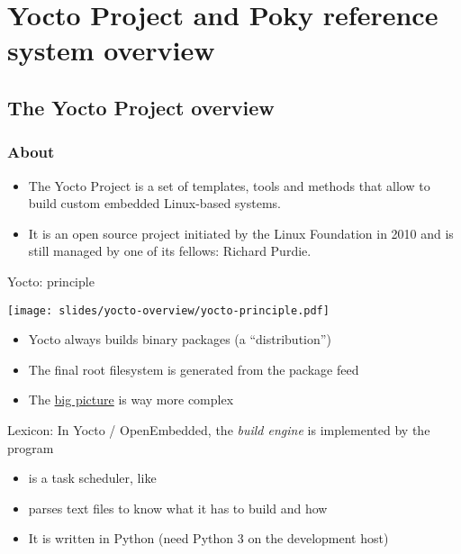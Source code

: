 \section{Yocto Project and Poky reference system overview}

\subsection{The Yocto Project overview}

\begin{frame}
  \frametitle{About}
  \begin{itemize}
  \item The Yocto Project is a set of templates, tools and methods
        that allow to build custom embedded Linux-based systems.
  \item It is an open source project initiated by the Linux Foundation
        in 2010 and is still managed by one of its fellows: Richard
        Purdie.
  \end{itemize}
\end{frame}

\begin{frame}{Yocto: principle}
  \begin{center}
    \texttt{[image: slides/yocto-overview/yocto-principle.pdf]}
  \end{center}
  \begin{itemize}
  \item Yocto always builds binary packages (a ``distribution'')
  \item The final root filesystem is generated from the package feed
  \item The \href{https://docs.yoctoproject.org/_images/YP-flow-diagram.png}
                 {big picture} is way more complex
  \end{itemize}
\end{frame}

\begin{frame}{Lexicon: }
  In Yocto / OpenEmbedded, the {\em build engine} is implemented by the
   program
  \begin{itemize}
    \item {} is a task scheduler, like 
    \item {} parses text files
      to know what it has to build and how
    \item It is written in Python (need Python 3 on the development host)
  \end{itemize}
\end{frame}


